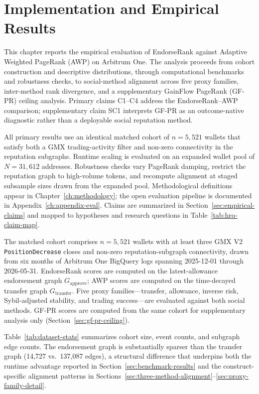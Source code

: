 \chapter{Implementation and Empirical Results}
\label{ch:results}

This chapter reports the empirical evaluation of EndorseRank against Adaptive Weighted PageRank (AWP) on Arbitrum One. The analysis proceeds from cohort construction and descriptive distributions, through computational benchmarks and robustness checks, to social-method alignment across five proxy families, inter-method rank divergence, and a supplementary GainFlow PageRank (GF-PR) ceiling analysis. Primary claims C1--C4 address the EndorseRank--AWP comparison; supplementary claim SC1 interprets GF-PR as an outcome-native diagnostic rather than a deployable social reputation method.

All primary results use an identical matched cohort of $n=5{,}521$ wallets that satisfy both a GMX trading-activity filter and non-zero connectivity in the reputation subgraphs. Runtime scaling is evaluated on an expanded wallet pool of $N=31{,}612$ addresses. Robustness checks vary PageRank damping, restrict the reputation graph to high-volume tokens, and recompute alignment at staged subsample sizes drawn from the expanded pool. Methodological definitions appear in Chapter~\ref{ch:methodology}; the open evaluation pipeline is documented in Appendix~\ref{ch:appendix-eval}. Claims are summarized in Section~\ref{sec:empirical-claims} and mapped to hypotheses and research questions in Table~\ref{tab:hrq-claim-map}.


The matched cohort comprises $n=5{,}521$ wallets with at least three GMX V2 \texttt{PositionDecrease} closes and non-zero reputation-subgraph connectivity, drawn from six months of Arbitrum One BigQuery logs spanning 2025-12-01 through 2026-05-31. EndorseRank scores are computed on the latest-allowance endorsement graph $G_{\text{approve}}$; AWP scores are computed on the time-decayed transfer graph $G_{\text{transfer}}$. Five proxy families---transfer, allowance, inverse risk, Sybil-adjusted stability, and trading success---are evaluated against both social methods. GF-PR scores are computed from the same cohort for supplementary analysis only (Section~\ref{sec:gf-pr-ceiling}).

Table~\ref{tab:dataset-stats} summarizes cohort size, event counts, and subgraph edge counts. The endorsement graph is substantially sparser than the transfer graph (14{,}727 vs.\ 137{,}087 edges), a structural difference that underpins both the runtime advantage reported in Section~\ref{sec:benchmark-results} and the construct-specific alignment patterns in Sections~\ref{sec:three-method-alignment}--\ref{sec:proxy-family-detail}.

